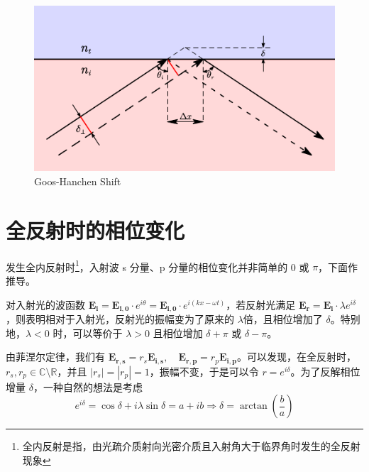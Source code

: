 \documentclass[UTF8]{report}
\def\R{\mathbb{R}}
\def\C{\mathbb{C}}
\theoremstyle{MyLineTheoremStyle} %
\theoremstyle{MyBlockTheoremStyle} %
\theoremstyle{MySubsubsectionStyle} %
\begin{document}
\begin{figure}[H]\centering
\includegraphics[width=0.8\columnwidth]{assets/1,2/GHShift.pdf}
\caption{ Goos-Hanchen Shift}\label{Goos-Hanchen Shift}
\end{figure}

\section{全反射时的相位变化}\label{全反射时的相位变化}


发生全内反射时\footnote{全内反射是指，由光疏介质射向光密介质且入射角大于临界角时发生的全反射现象}，入射波 s 分量、p 分量的相位变化并非简单的 0 或 $\pi$，下面作推导。

对入射光的波函数 $\boldsymbol{E_i} = \boldsymbol{E_{i,0}} \cdot e^{i \theta} =\boldsymbol{E_{i,0}} \cdot e^{i(k x - \omega t)}$，若反射光满足 $\boldsymbol{E_{r}} = \boldsymbol{E_i}\cdot \lambda e^{i \delta}$，则表明相对于入射光，反射光的振幅变为了原来的 $\lambda$倍，且相位增加了 $\delta$。特别地，$\lambda < 0$ 时，可以等价于 $\lambda > 0$ 且相位增加 $\delta + \pi$ 或 $\delta - \pi$。

由菲涅尔定律，我们有 $\boldsymbol{E_{r,s}} = r_s \boldsymbol{E_{i,s}},\quad \boldsymbol{E_{r,p}} = r_p \boldsymbol{E_{i,p}}$。可以发现，在全反射时，$r_s, r_p \in \C \setminus \R$，并且 $| r_s | = | r_p | = 1$，振幅不变，于是可以令 $r = e^{i \delta }$。为了反解相位增量 $\delta $，一种自然的想法是考虑 
\begin{equation}
    e^{i \delta} = \cos \delta + i \lambda \sin \delta = a + ib \Longrightarrow  \delta =  \arctan \left( \frac{b}{a} \right)
\end{equation}
\end{document}
